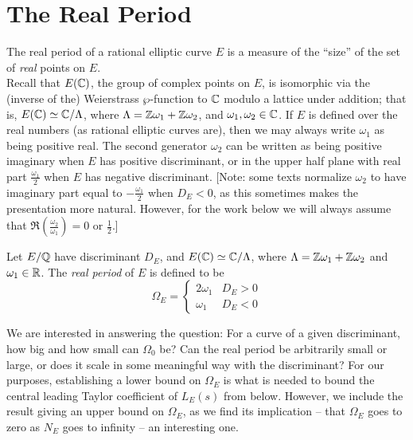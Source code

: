 \documentclass[10pt]{article}
\newcommand{\Les}{L_E(s)}
\begin{document}
\newpage
\section{The Real Period}

The real period of a rational elliptic curve $E$ is a measure of the ``size'' of the set of {\it real} points on $E$. \\

Recall that $E(\mathbb{C})$, the group of complex points on $E$, is isomorphic via the (inverse of the) Weierstrass $\wp$-function to $\mathbb{C}$ modulo a lattice under addition; that is, $E(\mathbb{C}) \simeq \mathbb{C}/\Lambda$, where $\Lambda = \mathbb{Z}\omega_1 + \mathbb{Z}\omega_2$, and $\omega_1,\omega_2 \in \mathbb{C}$.
If $E$ is defined over the real numbers (as rational elliptic curves are), then we may always write $\omega_1$ as being positive real. The second generator $\omega_2$ can be written as being positive imaginary when $E$ has positive discriminant, or in the upper half plane with real part $\frac{\omega_1}{2}$ when $E$ has negative discriminant. [Note: some texts normalize $\omega_2$ to have imaginary part equal to $-\frac{\omega_1}{2}$ when $D_E<0$, as this sometimes makes the presentation more natural. However, for the work below we will always assume that $\Re(\frac{\omega_2}{\omega_1}) = 0$ or $\frac{1}{2}$.]

\begin{definition}\label{defn:real_period}
Let $E/\mathbb{Q}$ have discriminant $D_E$, and $E(\mathbb{C}) \simeq \mathbb{C}/\Lambda$, where $\Lambda = \mathbb{Z}\omega_1 + \mathbb{Z}\omega_2$ and $\omega_1 \in \mathbb{R}$. The {\it real period} of $E$ is defined to be
\begin{equation}
\Omega_E = \begin{cases} 2\omega_1 & D_E > 0 \\ \omega_1 & D_E < 0 \end{cases}
\end{equation}
\end{definition}

We are interested in answering the question: For a curve of a given discriminant, how big and how small can $\Omega_0$ be? Can the real period be arbitrarily small or large, or does it scale in some meaningful way with the discriminant? For our purposes, establishing a lower bound on $\Omega_E$ is what is needed to bound the central leading Taylor coefficient of $\Les$ from below. However, we include the result giving an upper bound on $\Omega_E$, as we find its implication -- that $\Omega_E$ goes to zero as $N_E$ goes to infinity -- an interesting one. \\
\end{document}
